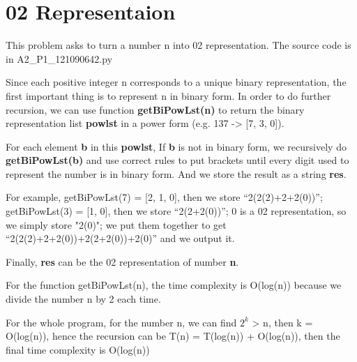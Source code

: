 

\section{02 Representaion}
This problem asks to turn a number n into 02 representation. The source code is in A2\_P1\_121090642.py

Since each positive integer n corresponds to a unique binary representation, the first important thing is to represent n in binary form. In order to do further recursion, we can use function \textbf{getBiPowLst(n)} to return the binary representation list \textbf{powlst} in a power form (e.g. 137 -> [7, 3, 0]).

For each element \textbf{b} in this \textbf{powlst},  If \textbf{b} is not in binary form, we recursively do \textbf{getBiPowLst(b)} and use correct rules to put brackets until every digit used to represent the number is in binary form. And we store the result as a string \textbf{res}.

For example, getBiPowLst(7) = [2, 1, 0], then we store “2(2(2)+2+2(0))”; getBiPowLst(3) = [1, 0], then we store “2(2+2(0))”; 0 is a 02 representation, so we simply store "2(0)"; we put them together to get “2(2(2)+2+2(0))+2(2+2(0))+2(0)” and we output it.

Finally, \textbf{res} can be the 02 representation of number \textbf{n}.

For the function getBiPowLst(n), the time complexity is O(log(n)) because we divide the number n by 2 each time.

For the whole program, for the number n, we can find $2^k$ > n, then k = O(log(n)), hence the recursion can be T(n) = T(log(n)) + O(log(n)), then the final time complexity is O(log(n))

